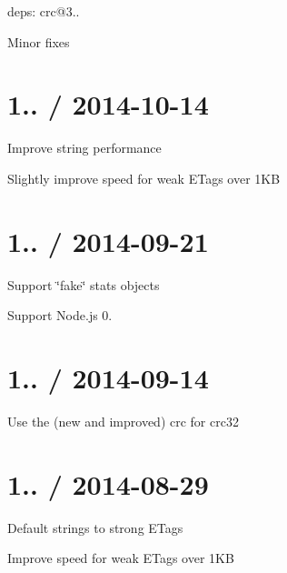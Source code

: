 
\begin{DoxyItemize}
\item deps\+: crc@3..
\begin{DoxyItemize}
\item Minor fixes
\end{DoxyItemize}
\end{DoxyItemize}

\section*{1.. / 2014-\/10-\/14 }


\begin{DoxyItemize}
\item Improve string performance
\item Slightly improve speed for weak E\+Tags over 1\+K\+B
\end{DoxyItemize}

\section*{1.. / 2014-\/09-\/21 }


\begin{DoxyItemize}
\item Support \char`\"{}fake\char`\"{} stats objects
\item Support Node.\+js 0.
\end{DoxyItemize}

\section*{1.. / 2014-\/09-\/14 }


\begin{DoxyItemize}
\item Use the (new and improved) {\ttfamily crc} for crc32
\end{DoxyItemize}

\section*{1.. / 2014-\/08-\/29 }


\begin{DoxyItemize}
\item Default strings to strong E\+Tags
\item Improve speed for weak E\+Tags over 1\+K\+B
\end{DoxyItemize}

